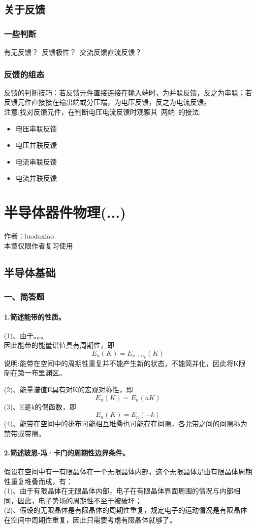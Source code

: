 \documentclass[cn,11pt]{elegantbook}
\begin{document}
\section{关于反馈}
\subsection{一些判断}
有无反馈？\ 反馈极性？\ 交流反馈直流反馈？
\subsection{反馈的组态}
反馈的判断技巧：若反馈元件直接连接在输入端时，为并联反馈，反之为串联；若反馈元件直接接在输出端或分压端，为电压反馈，反之为电流反馈。\\
{\heiti 注意}:找对反馈元件，在判断电压电流反馈时观察其\ {\large 两端}\ 的接法.
\begin{itemize}
	\item 电压串联反馈\item 电压并联反馈 \item 电流串联反馈 \item 电流并联反馈
\end{itemize}
\chapter{半导体器件物理(...)}

{ 作者：luodaxiao\\本章仅限作者复习使用}
\section{半导体基础}
\subsection*{一、简答题}
\subsubsection*{1.简述能带的性质。}
(1)、由于。。。\\
因此能带的能量谱值具有周期性，即$$E_{n}(K)=E_{n+n_{k}}(K)$$
说明:能带在空间中的周期性重复并不能产生新的状态，不能简并化，因此将K限制在第一布里渊区。

(2)、能量谱值E具有对K的宏观对称性，即$$E_{n}(K)=E_{n}(aK)$$
(3)、E是k的偶函数，即$$E_{n}(K)=E_{n}(-k)$$
(4)、能带在空间中的排布可能相互堆叠也可能存在间隙，各允带之间的间隙称为禁带或带隙。
\subsubsection*{2.简述玻恩-冯·卡门的周期性边界条件。}
假设在空间中有一有限晶体在一个无限晶体内部，这个无限晶体是由有限晶体周期性重复堆叠而成，有：\\
(1)、由于有限晶体在无限晶体内部，电子在有限晶体界面周围的情况与内部相同，因此，电子势场的周期性不至于被破坏；\\
(2)、假设的无限晶体是有限晶体的周期性重复，规定电子的运动情况是有限晶体在空间中周期性重复，因此只需要考虑有限晶体就够了。
\end{document}
